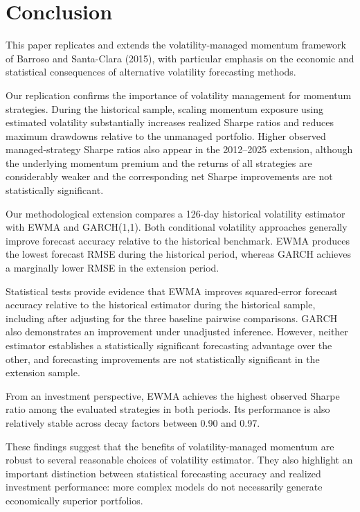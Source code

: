 \documentclass[11pt]{article}
\begin{document}
\section{Conclusion}

This paper replicates and extends the
volatility-managed momentum framework
of Barroso and Santa-Clara (2015),
with particular emphasis on the
economic and statistical consequences
of alternative volatility forecasting
methods.

Our replication confirms the
importance of volatility management
for momentum strategies. During the
historical sample, scaling momentum
exposure using estimated volatility
substantially increases realized
Sharpe ratios and reduces maximum
drawdowns relative to the unmanaged
portfolio. Higher observed managed-strategy Sharpe ratios also appear
in the 2012--2025 extension,
although the underlying momentum
premium and the returns of all
strategies are considerably weaker and the corresponding
net Sharpe improvements are not statistically significant.

Our methodological extension
compares a 126-day historical
volatility estimator with EWMA
and GARCH(1,1). Both conditional
volatility approaches generally
improve forecast accuracy relative
to the historical benchmark.
EWMA produces the lowest forecast
RMSE during the historical period,
whereas GARCH achieves a marginally
lower RMSE in the extension period.

Statistical tests provide evidence
that EWMA improves squared-error
forecast accuracy relative to the
historical estimator during the
historical sample, including after
adjusting for the three baseline
pairwise comparisons. GARCH also
demonstrates an improvement under
unadjusted inference. However,
neither estimator establishes a
statistically significant forecasting
advantage over the other, and
forecasting improvements are not
statistically significant in the
extension sample.

From an investment perspective,
EWMA achieves the highest observed
Sharpe ratio among the evaluated
strategies in both periods. Its
performance is also relatively
stable across decay factors
between 0.90 and 0.97.

These findings suggest that the
benefits of volatility-managed
momentum are robust to several
reasonable choices of volatility
estimator. They also highlight
an important distinction between
statistical forecasting accuracy
and realized investment
performance: more complex models
do not necessarily generate
economically superior portfolios.
\end{document}
